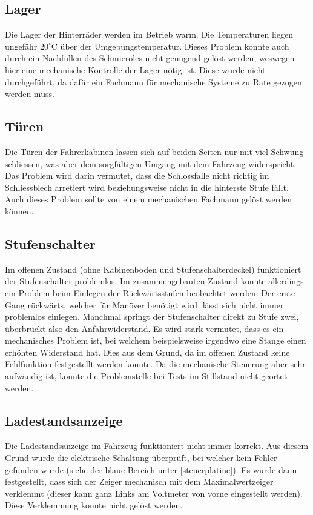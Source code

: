 \subsection{Lager}
Die Lager der Hinterräder werden im Betrieb warm. Die Temperaturen liegen ungefähr $20^\circ$C über der Umgebungstemperatur. Dieses Problem konnte auch durch ein Nachfüllen des Schmieröles nicht genügend gelöst werden, weswegen hier eine mechanische Kontrolle der Lager nötig ist. Diese wurde nicht durchgeführt, da dafür ein Fachmann für mechanische Systeme zu Rate gezogen werden muss.

\subsection{Türen}
Die Türen der Fahrerkabinen lassen sich auf beiden Seiten nur mit viel Schwung schliessen, was aber dem sorgfältigen Umgang mit dem Fahrzeug widerspricht. Das Problem wird darin vermutet, dass die Schlossfalle nicht richtig im Schliessblech arretiert wird beziehungsweise nicht in die hinterste Stufe fällt. Auch dieses Problem sollte von einem mechanischen Fachmann gelöst werden können.

\subsection{Stufenschalter}
Im offenen Zustand (ohne Kabinenboden und Stufenschalterdeckel) funktioniert der Stufenschalter problemlos. Im zusammengebauten Zustand konnte allerdings ein Problem beim Einlegen der Rückwärtsstufen beobachtet werden: Der erste Gang rückwärts, welcher für Manöver benötigt wird, lässt sich nicht immer problemlos einlegen. Manchmal springt der Stufenschalter direkt zu Stufe zwei, überbrückt also den Anfahrwiderstand. Es wird stark vermutet, dass es ein mechanisches Problem ist, bei welchem beispielsweise irgendwo eine Stange einen erhöhten Widerstand hat. Dies aus dem Grund, da im offenen Zustand keine Fehlfunktion festgestellt werden konnte. Da die mechanische Steuerung aber sehr aufwändig ist, konnte die Problemstelle bei Tests im Stillstand nicht geortet werden.

\subsection{Ladestandsanzeige}
Die Ladestandsanzeige im Fahrzeug funktioniert nicht immer korrekt. Aus diesem Grund wurde die elektrische Schaltung überprüft, bei welcher kein Fehler gefunden wurde (siehe der blaue Bereich unter \ref{steuerplatine}). Es wurde dann festgestellt, dass sich der Zeiger mechanisch mit dem Maximalwertzeiger verklemmt (dieser kann ganz Links am Voltmeter von vorne eingestellt werden). Diese Verklemmung konnte nicht gelöst werden.

\color{black}